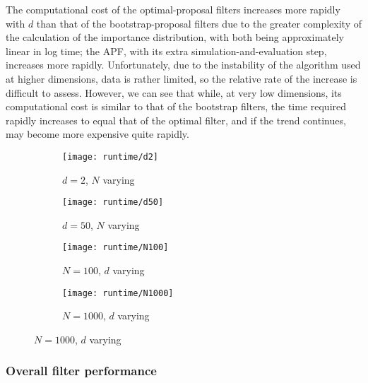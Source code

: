 \documentclass[10pt,fleqn]{article}
\begin{document}
The computational cost of the optimal-proposal filters increases more rapidly with $d$ than that of the bootstrap-proposal filters due to the greater complexity of the calculation of the importance distribution, with both being approximately linear in log time; the APF, with its extra simulation-and-evaluation step, increases more rapidly. Unfortunately, due to the instability of the algorithm used at higher dimensions, data is rather limited, so the relative rate of the increase is difficult to assess. However, we can see that while, at very low dimensions, its computational cost is similar to that of the bootstrap filters, the time required rapidly increases to equal that of the optimal filter, and if the trend continues, may become more expensive quite rapidly.

\begin{figure}[H]		%
\caption{Time (in seconds) taken to run each filter with increasing dimension $d$ and number of particles $N$.}
\label{fig:runtime}
	\begin{subfigure}[t]{0.5\textwidth}
		\caption{$d = 2$, $N$ varying}
		\texttt{[image: runtime/d2]}
	\end{subfigure}
	\begin{subfigure}[t]{0.5\textwidth}
		\caption{$d = 50$, $N$ varying}
		\texttt{[image: runtime/d50]}
	\end{subfigure}
	
	\vspace{10pt}
	

	\begin{subfigure}[t]{0.5\textwidth}
		\caption{$N = 100$, $d$ varying}
		\texttt{[image: runtime/N100]}
	\end{subfigure}
	\begin{subfigure}[t]{0.5\textwidth}
		\caption{$N = 1000$, $d$ varying}
		\texttt{[image: runtime/N1000]}
	\end{subfigure}
\end{figure}

\subsubsection{Overall filter performance}
\end{document}
